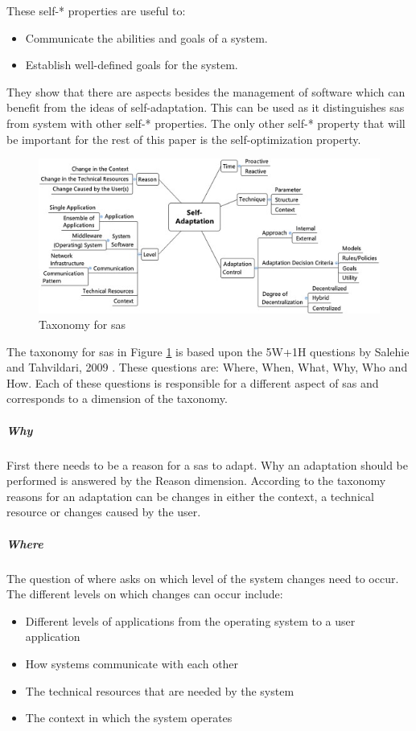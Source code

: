 \noindent These self-* properties are useful to:
\begin{itemize}[nosep]
    \item Communicate the abilities and goals of a system.
    \item Establish well-defined goals for the system.
\end{itemize}
They show that there are aspects besides the management of software which can benefit from the ideas of self-adaptation.
This can be used as it distinguishes \acrshort{sas} from system with other self-* properties.
The only other self-* property that will be important for the rest of this paper is the self-optimization property.

\begin{figure}[t!]
    \includegraphics[width=\textwidth]{images/KrupitzerTaxonomy.jpg}
    \caption{Taxonomy for \acrshort{sas} \cite*{SurveyOnEngineeringApproaches}}
    \label{fig:KrupitzerTaxonomy}
\end{figure}

\noindent The taxonomy for \acrshort{sas} in Figure \ref{fig:KrupitzerTaxonomy}
is based upon the 5W+1H questions by Salehie and Tahvildari, 2009 \cite*{LandscapeAndResearchChallenges}.
These questions are: Where, When, What, Why, Who and How.
Each of these questions is responsible for a different aspect of \acrshort{sas} and corresponds to a dimension of the taxonomy.

\subparagraph*{Why}
First there needs to be a reason for a \acrshort{sas} to adapt. Why an adaptation should be performed is answered by the Reason dimension.
According to the taxonomy reasons for an adaptation can be changes in either the context, a technical resource or changes caused by the user.

\subparagraph*{Where}
The question of where asks on which level of the system changes need to occur.
The different levels on which changes can occur include:
\begin{itemize}[nosep]
    \item Different levels of applications from the operating system to a user application
    \item How systems communicate with each other
    \item The technical resources that are needed by the system
    \item The context in which the system operates
\end{itemize}

